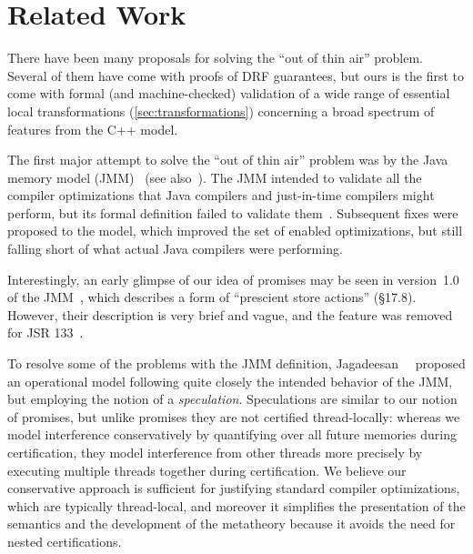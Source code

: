 \section{Related Work}\label{sec:related}


There have been many proposals for solving the ``out of thin air''
problem.  Several of them have come with proofs of DRF guarantees, but
ours is the first to come with formal (and machine-checked) validation
of a wide range of essential local transformations
(\cref{sec:transformations}) concerning a broad spectrum of features
from the C++ model.


The first major attempt to solve the ``out of thin air'' problem was by the Java memory model (JMM)~\cite{jmm} (see also~\cite{Lochbihler2014TOPLAS}).
The JMM intended to validate all the compiler optimizations that Java compilers and just-in-time compilers might perform,
but its formal definition failed to validate them~\cite{sevcik:jmm}.
Subsequent fixes were proposed to the model, which improved the set of enabled optimizations, 
but still falling short of what actual Java compilers were performing.

Interestingly, an early glimpse of our idea of promises may be seen in
version~1.0 of the JMM~\cite{jmm-1.0}, which describes a form of
``prescient store actions'' (\S{17.8}).  However, their description is
very brief and vague, and the feature was removed for JSR
133~\cite{jsr133}.

To resolve some of the problems with the JMM definition,
\mbox{Jagadeesan~\etal}~\cite{Jagadeesan2010} proposed an operational
model following quite closely the intended behavior of the JMM, but
employing the notion of a \emph{speculation}.  Speculations are
similar to our notion of promises, but unlike promises they are not
certified thread-locally: whereas we model interference conservatively
by quantifying over all future memories during certification, they
model interference from other threads more precisely by executing
multiple threads together during certification.  We believe our
conservative approach is sufficient for justifying standard compiler
optimizations, which are typically thread-local, and moreover it
simplifies the presentation of the semantics and the development of
the metatheory because it avoids the need for nested certifications.

